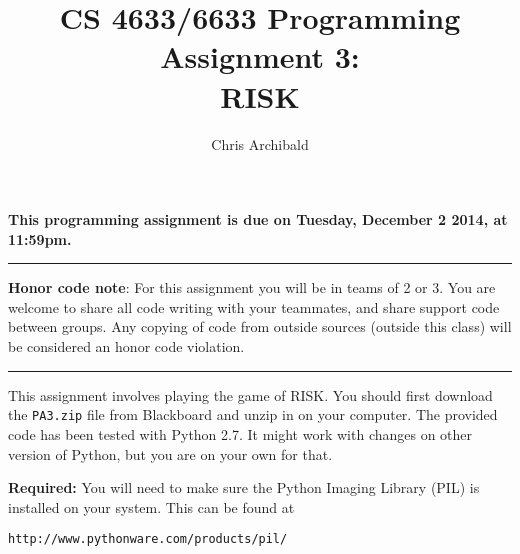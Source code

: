 \documentclass[10pt,a4paper]{article}
\begin{document}
\title{CS 4633/6633 Programming Assignment 3: \\ RISK}
\author{Chris Archibald}
\maketitle

\textbf{This programming assignment is due on Tuesday, December 2 2014, at 11:59pm.}

\vspace{5pt}

\hrule
\vspace{8pt}

\textbf{Honor code note}: For this assignment you will be in teams of 2 or 3.  You are welcome to share all code writing with your teammates, and share support code between groups. Any copying of code from outside sources (outside this class) will be considered an honor code violation.

\vspace{8pt}
\hrule
\vspace{8pt}

This assignment involves playing the game of RISK.  You should first download the \texttt{PA3.zip} file from Blackboard and unzip in on your computer.  The provided code has been tested with Python 2.7.  It might work with changes on other version of Python, but you are on your own for that.

\textbf{Required:} You will need to make sure the Python Imaging Library (PIL) is installed on your system.  This can be found at 

\texttt{http://www.pythonware.com/products/pil/}
\end{document}
